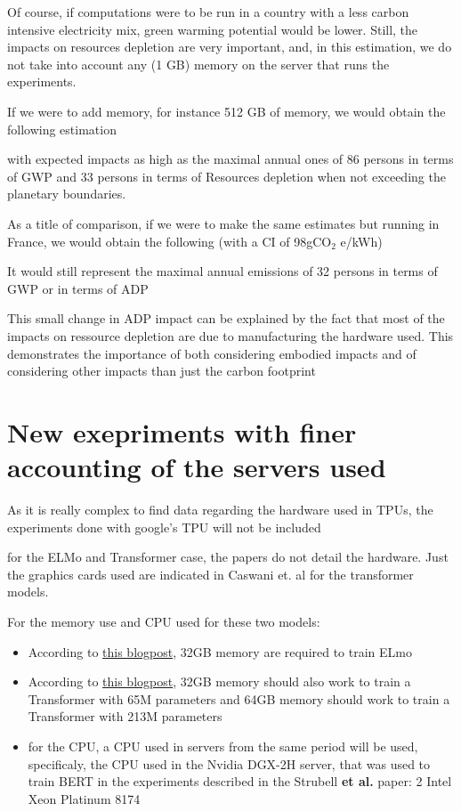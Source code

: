 \documentclass[11pt]{article}
\begin{document}
Of course, if computations were to be run in a country with a
less carbon intensive electricity mix, green warming potential would
be lower. Still, the impacts on resources depletion are very
important, and, in this estimation, we do not take into account any (1
GB) memory on the server that runs the experiments. 

If we were to add memory, for instance 512 GB of memory, we would
obtain the following estimation

with expected impacts as high as the maximal annual ones of 86 persons
in terms of \gls{GWP} and 33 persons in terms of Resources depletion
when not exceeding the planetary boundaries.

As a title of comparison, if we were to make the same estimates but
running in France, we would obtain the following (with a \gls{CI} of 98gCO\(_{\text{2}}\) e/kWh)

It would still represent the maximal annual emissions of 32 persons in
terms of \gls{GWP} or in terms of \gls{ADP}

This small change in \gls{ADP} impact can be explained by the fact that most of
the impacts on ressource depletion are due to manufacturing the
hardware used. This demonstrates the importance of both considering
embodied impacts and of considering other impacts than just the carbon footprint



\section{New exepriments with finer accounting of the servers used}
\label{sec:orgbaa1e59}

As it is really complex to find data regarding the hardware used in
TPUs, the experiments done with google's TPU will not be included

for the ELMo and Transformer case, the papers do not detail the
hardware. Just the graphics cards used are indicated in Caswani et. al
for the transformer models. 

For the memory use and CPU used for these two models:
\begin{itemize}
\item According to \href{https://docs.deeppavlov.ai/en/0.9.0/apiref/models/elmo.html}{this blogpost}, 32GB memory are required to train ELmo
\item According to \href{https://www.trentonbricken.com/TransformerMemoryRequirements/}{this blogpost}, 32GB memory should also work to train a
Transformer with 65M parameters and 64GB memory should work to train
a Transformer with 213M parameters
\item for the CPU, a CPU used in servers from the same period will be
used, specificaly, the CPU used in the Nvidia DGX-2H server, that
was used to train BERT in the experiments described in the Strubell
\textbf{et al.} paper: 2 Intel Xeon Platinum 8174
\end{itemize}
\end{document}
